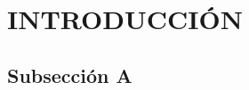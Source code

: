 \documentclass[man]{apa}
\begin{document}
    \section{INTRODUCCIÓN} %
    \subsection{Subsección A} %
    \lipsum
\end{document}
